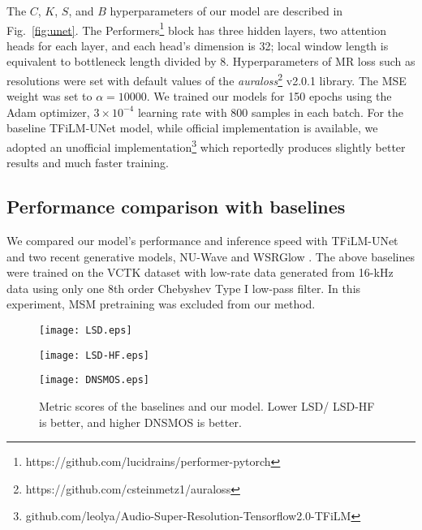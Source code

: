 \documentclass{article}
\begin{document}
The $C$, $K$, $S$, and $B$ hyperparameters of our model are described in Fig.~\ref{fig:unet}. The Performers\footnote{https://github.com/lucidrains/performer-pytorch} block has three hidden layers, two attention heads for each layer, and each head's dimension is 32; local window length is equivalent to bottleneck length divided by 8. Hyperparameters of MR loss such as resolutions were set with default values of the \textit{auraloss}\footnote{https://github.com/csteinmetz1/auraloss} v2.0.1 library. The MSE weight was set to $\alpha=10000$. We trained our models for 150 epochs using the Adam optimizer, $3\times 10^{-4}$ learning rate with 800 samples in each batch. For the baseline TFiLM-UNet model, while official implementation is available, we adopted an unofficial implementation\footnote{github.com/leolya/Audio-Super-Resolution-Tensorflow2.0-TFiLM} which reportedly produces slightly better results and much faster training. 
\vspace{-0.3cm}

\subsection{Performance comparison with baselines}
\vspace{-0.2cm}
\label{sec:per}
We compared our model's performance and inference speed with TFiLM-UNet and two recent generative models, NU-Wave \cite{nuwave} and WSRGlow \cite{wsrglow}. The above baselines were trained on the VCTK dataset with low-rate data generated from 16-kHz data using only one 8th order Chebyshev Type I low-pass filter. In this experiment, MSM pretraining was excluded from our method.
\begin{figure}
\centering
\begin{minipage}[b]{.48\linewidth}
  \raggedright
  \centerline{\texttt{[image: LSD.eps]}}
\end{minipage}


\begin{minipage}[b]{.48\linewidth}
  \raggedright
  \centerline{\texttt{[image: LSD-HF.eps]}}
\end{minipage}




\begin{minipage}[b]{.48\linewidth}
  \raggedright
  \centerline{\texttt{[image: DNSMOS.eps]}}
\end{minipage}
\caption{Metric scores of the baselines and our model. Lower LSD/ LSD-HF is better, and higher DNSMOS is better.}
\label{fig:scores}

\end{figure}
\end{document}
